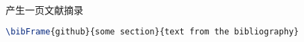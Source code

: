 产生一页文献摘录
\begin{lstlisting}[language=tex]
\bibFrame{github}{some section}{text from the bibliography}
\end{lstlisting}